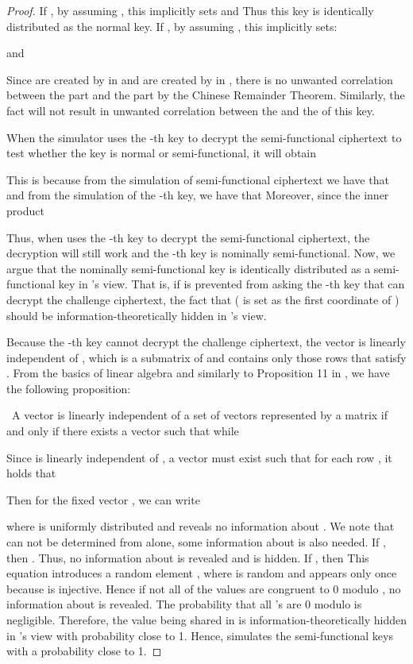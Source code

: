 \documentclass[twocolumn]{svjour3}          \smartqed  \usepackage{graphicx}
\begin{document}
\begin{proof}
If , by assuming , this implicitly sets
 and 
Thus this key is identically distributed as the normal key. If , by assuming , this implicitly sets:

and

Since  are created by  in  and  are created by  in , there is no unwanted correlation
between the  part and the  part by the Chinese Remainder Theorem. Similarly, the fact
 will not result in unwanted correlation between the
  and the   of this key.

When the simulator  uses the -th key to decrypt the semi-functional ciphertext  to test whether the key is normal or
semi-functional, it will obtain


This is because from the simulation of semi-functional ciphertext we have that  and from the simulation of the -th key, we have that   Moreover, since the inner product


Thus, when  uses the -th key to decrypt the semi-functional ciphertext, the decryption will still work and the -th key is
nominally semi-functional. Now, we argue that the nominally semi-functional key is identically distributed as a semi-functional key in 's
view. That is, if  is prevented from asking the -th key that can decrypt the challenge ciphertext, the fact that 
( is set as the first coordinate of ) should be information-theoretically hidden in 's view.

Because the -th key cannot decrypt the challenge ciphertext, the vector  is linearly independent of , which is a
submatrix of  and contains only those rows that satisfy . From the basics of linear algebra and similarly to Proposition 11 in
\cite{LOS+10}, we have the following proposition:

\begin{proposition}~A vector  is linearly independent of a set of vectors represented by a matrix  if and only if there exists a
vector  such that  while 
\end{proposition}

Since  is linearly independent of , a vector  must exist such that for each row , it holds that

Then for the fixed vector , we can write

where  is uniformly distributed and reveals no information about . We note that  can not be determined from
 alone, some information about  is also needed.
If , then . Thus, no information about  is revealed and  is hidden.
If , then 
This equation introduces a random element , where  is random and appears only once because  is injective. Hence if not
all of the  values are congruent to 0 modulo , no information about  is revealed. The probability that all 's are 0 modulo  is negligible.
Therefore, the value being shared in  is information-theoretically hidden in 's view with probability close to 1. Hence,
 simulates the semi-functional keys with a probability close to 1.


\end{proof}
\end{document}
